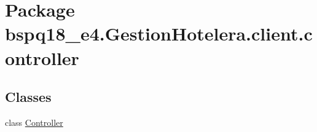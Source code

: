 \hypertarget{namespacebspq18__e4_1_1_gestion_hotelera_1_1client_1_1controller}{}\section{Package bspq18\+\_\+e4.\+Gestion\+Hotelera.\+client.\+controller}
\label{namespacebspq18__e4_1_1_gestion_hotelera_1_1client_1_1controller}
\subsection*{Classes}
\begin{DoxyCompactItemize}
\item 
class \mbox{\hyperlink{classbspq18__e4_1_1_gestion_hotelera_1_1client_1_1controller_1_1_controller}{Controller}}
\end{DoxyCompactItemize}
